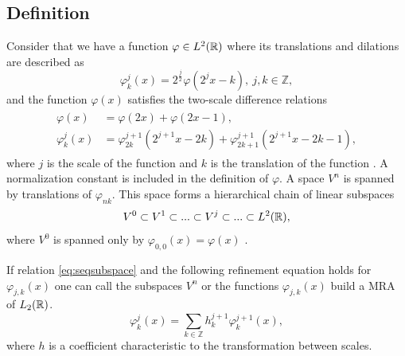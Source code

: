 \documentclass[../Thesis.tex]{subfiles}
\begin{document}
\subsection{Definition}
Consider that we have a function $\varphi \in L^2(\mathbb{R})$ where its translations
and dilations are described as \cite{Schneider:2007}
\begin{equation}
  \varphi^j_k(x) = 2^{\frac{j}{2}}\varphi(2^jx - k),\  j,k \in \mathbb{Z},
\end{equation}
and the function $\varphi(x)$ satisfies the two-scale difference relations \cite{Beylkin:MRA, Schneider:2007, Sorland}
\begin{align}
  \begin{split}
    \varphi(x) &= \varphi(2x) + \varphi(2x - 1),\\
    \varphi^j_k(x) &= \varphi^{j+1}_{2k}(2^{j+1}x - 2k) + \varphi^{j+1}_{2k+1}(2^{j+1}x - 2k - 1),
  \end{split}
\end{align}
where $j$ is the scale of the function and $k$ is the translation of the function
\cite{Sorland}. A normalization constant is included in the definition of $\varphi$.
A space $V^n$ is spanned by translations of $\varphi_{nk}$. This space forms a
hierarchical chain of linear
subspaces \cite{Beylkin:MRA}
\begin{equation}
  V^0 \subset V^1 \subset ... \subset V^j \subset ... \subset L^2(\mathbb{R})\label{eq:seqsubspace},
\end{equation}
where $V^0$ is spanned only by $\varphi_{0,0}(x)=\varphi(x)$ \cite{Sorland}.

If relation \ref{eq:seqsubspace} and the following refinement equation holds for $\varphi_{j,k}(x)$
one can call the subspaces $V^n$ or the functions $\varphi_{j,k}(x)$ build a \ac{MRA} of $L_2(\mathbb{R})$.
\begin{equation}
\varphi^j_k(x) = \sum_{k\in\mathbb{Z}} h^{j+1}_k\varphi^{j+1}_k(x),
\end{equation}
where $h$ is a coefficient characteristic to the transformation between scales.
\end{document}
